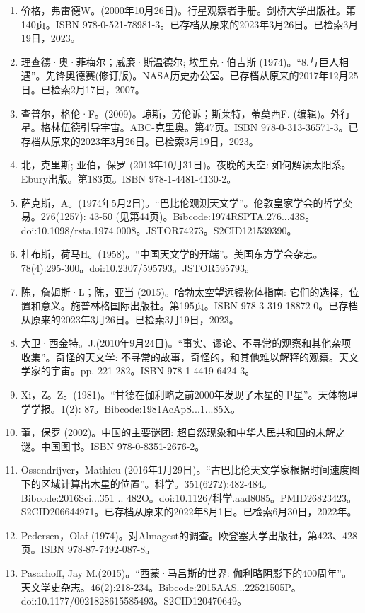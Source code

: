 \begin{enumerate}
\item 价格，弗雷德W。(2000年10月26日)。行星观察者手册。剑桥大学出版社。第140页。ISBN 978-0-521-78981-3。已存档从原来的2023年3月26日。已检索3月19日，2023。
\item 理查德·奥·菲梅尔；威廉·斯温德尔; 埃里克·伯吉斯 (1974)。“8.与巨人相遇”。先锋奥德赛(修订版)。NASA历史办公室。已存档从原来的2017年12月25日。已检索2月17日，2007。
\item 查普尔，格伦·F。(2009)。琼斯，劳伦诉；斯莱特，蒂莫西F. (编辑)。外行星。格林伍德引导宇宙。ABC-克里奥。第47页。ISBN 978-0-313-36571-3。已存档从原来的2023年3月26日。已检索3月19日，2023。
\item 北，克里斯; 亚伯，保罗 (2013年10月31日)。夜晚的天空: 如何解读太阳系。Ebury出版。第183页。ISBN 978-1-4481-4130-2。
\item 萨克斯，A。(1974年5月2日)。“巴比伦观测天文学”。伦敦皇家学会的哲学交易。276(1257): 43-50 (见第44页)。Bibcode:1974RSPTA.276...43S。doi:10.1098/rsta.1974.0008。JSTOR74273。S2CID121539390。  
\item 杜布斯，荷马H。(1958)。“中国天文学的开端”。美国东方学会杂志。78(4):295-300。doi:10.2307/595793。JSTOR595793。 
\item 陈，詹姆斯·L；陈，亚当 (2015)。哈勃太空望远镜物体指南: 它们的选择，位置和意义。施普林格国际出版社。第195页。ISBN 978-3-319-18872-0。已存档从原来的2023年3月26日。已检索3月19日，2023。
\item 大卫·西金特。J.(2010年9月24日)。“事实、谬论、不寻常的观察和其他杂项收集”。奇怪的天文学: 不寻常的故事，奇怪的，和其他难以解释的观察。天文学家的宇宙。pp. 221-282。ISBN 978-1-4419-6424-3。
\item Xi，Z。Z。(1981)。“甘德在伽利略之前2000年发现了木星的卫星”。天体物理学学报。1(2): 87。Bibcode:1981AcApS...1...85X。
\item 董，保罗 (2002)。中国的主要谜团: 超自然现象和中华人民共和国的未解之谜。中国图书。ISBN 978-0-8351-2676-2。
\item Ossendrijver，Mathieu (2016年1月29日)。“古巴比伦天文学家根据时间速度图下的区域计算出木星的位置”。科学。351(6272):482-484。Bibcode:2016Sci...351 .. 482O。doi:10.1126/科学.aad8085。PMID26823423。S2CID206644971。已存档从原来的2022年8月1日。已检索6月30日，2022年。  
\item Pedersen，Olaf (1974)。对Almagest的调查。欧登塞大学出版社，第423、428页。ISBN 978-87-7492-087-8。
\item Pasachoff, Jay M.(2015)。“西蒙·马吕斯的世界: 伽利略阴影下的400周年”。天文学史杂志。46(2):218-234。Bibcode:2015AAS...22521505P。doi:10.1177/0021828615585493。S2CID120470649。 

\end{enumerate}
